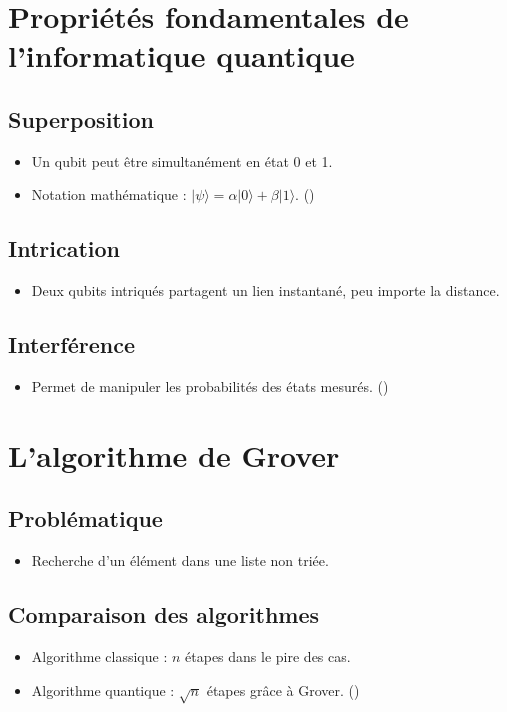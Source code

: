 \documentclass{article}
\begin{document}
\section{Propriétés fondamentales de l'informatique quantique}
\subsection{Superposition}
\begin{itemize}
    \item Un qubit peut être simultanément en état 0 et 1.
    \item Notation mathématique : \(|\psi\rangle = \alpha|0\rangle + \beta|1\rangle\). (\cite{youtubeYouTube})
\end{itemize}
\subsection{Intrication}
\begin{itemize}
    \item Deux qubits intriqués partagent un lien instantané, peu importe la distance.
\end{itemize}
\subsection{Interférence}
\begin{itemize}
    \item Permet de manipuler les probabilités des états mesurés. (\cite{dami})
\end{itemize}
\section{L'algorithme de Grover}
\subsection{Problématique}
\begin{itemize}
    \item Recherche d'un élément dans une liste non triée.
\end{itemize}
\subsection{Comparaison des algorithmes}
\begin{itemize}
    \item Algorithme classique : \(n\) étapes dans le pire des cas.
    \item Algorithme quantique : \(\sqrt{n}\) étapes grâce à Grover. (\cite{wikipediaAlgorithmeGrover})
\end{itemize}
\end{document}
